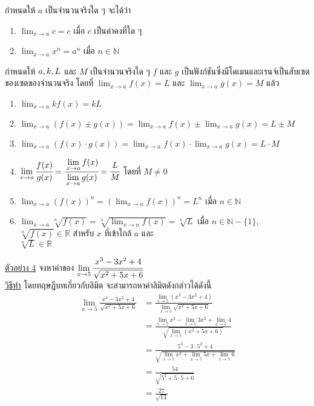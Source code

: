 \documentclass[hidelinks,12pt,a4paper]{article}
\newcommand{\s}{\space}
\newcommand{\nr}[2]{\sqrt[#1]{#2}}
\begin{document}
\begin{tcolorbox}[sharp corners, colback=green!30, colframe=green!80!blue, title=\textbf{ทฤษฎีบท (ลิมิต)}]
    กำหนดให้ $a$ เป็นจำนวนจริงใด ๆ จะได้ว่า
    \begin{enumerate}
        \item $\displaystyle\lim_{x\to a} c = c$ เมื่อ $c$ เป็นค่าคงที่ใด ๆ
        \item $\displaystyle\lim_{x\to a} x^n = a^n$ เมื่อ $n\in \mathbb{N}$
    \end{enumerate}
    \vspace{3mm}
    กำหนดให้ $a,\s k,\s L$  และ $M$ เป็นจำนวนจริงใด ๆ $f$ และ $g$ เป็นฟังก์ชันซึ่งมีโดเมนและเรนจ์เป็นสับเซตของเซตของจำนวนจริง โดยที่ $\displaystyle\lim_{x\to a} f(x) = L$ และ $\displaystyle\lim_{x\to a} g(x) = M$ แล้ว
    \begin{enumerate}
        \item $\displaystyle\lim_{x\to a} kf(x) = kL$
        \item $\displaystyle\lim_{x\to a} \left(f(x)\pm g(x)\right) = \displaystyle\lim_{x\to a} f(x) \pm \displaystyle\lim_{x\to a} g(x) = L\pm M$
        \item $\displaystyle\lim_{x\to a} \left(f(x)\cdot g(x)\right) = \displaystyle\lim_{x\to a} f(x) \cdot \displaystyle\lim_{x\to a} g(x) = L\cdot M$
        \item $\displaystyle\lim_{x\to a} \cfrac{f(x)}{g(x)} = \cfrac{\displaystyle\lim_{x\to a} f(x)}{\displaystyle\lim_{x\to a} g(x)}=\cfrac{L}{M}$ \s โดยที่ \s $M\neq 0$
        \item $\displaystyle\lim_{x\to a} \left(f(x)\right)^n = \left(\displaystyle\lim_{x\to a} f(x)\right)^n = L^n$ \s เมื่อ \s $n\in \mathbb{N}$
        \item $\displaystyle\lim_{x\to a} \sqrt[n]{f(x)} = \nr{n}{\displaystyle\lim_{x\to a} f(x)} = \nr{n}{L}$ \s เมื่อ \s $n\in\mathbb{N}-\{1\}$, \s $\nr{n}{f(x)}\in\mathbb{R}$ สำหรับ $x$ ที่เข้าใกล้ $a$ และ \\[0.5ex] $\nr{n}{L}\in\mathbb{R}$
    \end{enumerate}
\end{tcolorbox}
\newpage
\underline{ตัวอย่าง 4} จงหาค่าของ $\displaystyle\lim_{x\to 5} \cfrac{x^3-3x^2+4}{\sqrt{x^2+5x+6}}$ \\[1ex]
\underline{\underline{วิธีทำ}}\hspace{8mm} โดยทฤษฎีบทเกี่ยวกับลิมิต จะสามารถหาค่าลิมิตดังกล่าวได้ดังนี้
\begin{align*}
    \lim_{x\to 5} \frac{x^3-3x^2+4}{\sqrt{x^2+5x+6}} & = \frac{\displaystyle\lim_{x\to 5} (x^3-3x^2+4)}{\displaystyle\lim_{x\to 5} \sqrt{x^2+5x+6}} \\
    & = \frac{\displaystyle\lim_{x\to 5}x^3- \displaystyle\lim_{x\to 5}3x^2+ \displaystyle\lim_{x\to 5}4}{\sqrt{\displaystyle\lim_{x\to 5}(x^2+5x+6)}} \\
    & = \frac{5^3- 3\cdot5^2+4}{\sqrt{\displaystyle\lim_{x\to 5}x^2+\displaystyle\lim_{x\to 5}5x+\displaystyle\lim_{x\to 5}6}} \\
    & = \frac{54}{\sqrt{5^2+5\cdot5+6}} \\
    & = \frac{27}{\sqrt{14}}
\end{align*}
\end{document}
